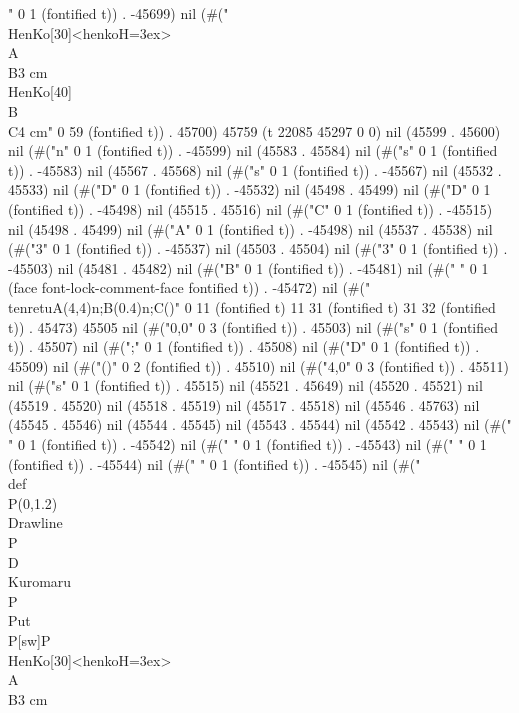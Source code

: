 " 0 1 (fontified t)) . -45699) nil (#("   \\HenKo[30]<henkoH=3ex>\\A\\B{3 cm}
   \\HenKo[40]\\B\\C{4 cm}" 0 59 (fontified t)) . 45700) 45759 (t 22085 45297 0 0) nil (45599 . 45600) nil (#("n" 0 1 (fontified t)) . -45599) nil (45583 . 45584) nil (#("s" 0 1 (fontified t)) . -45583) nil (45567 . 45568) nil (#("s" 0 1 (fontified t)) . -45567) nil (45532 . 45533) nil (#("D" 0 1 (fontified t)) . -45532) nil (45498 . 45499) nil (#("D" 0 1 (fontified t)) . -45498) nil (45515 . 45516) nil (#("C" 0 1 (fontified t)) . -45515) nil (45498 . 45499) nil (#("A" 0 1 (fontified t)) . -45498) nil (45537 . 45538) nil (#("3" 0 1 (fontified t)) . -45537) nil (45503 . 45504) nil (#("3" 0 1 (fontified t)) . -45503) nil (45481 . 45482) nil (#("B" 0 1 (fontified t)) . -45481) nil (#("
" 0 1 (face font-lock-comment-face fontified t)) . -45472) nil (#("   \\tenretu{A(4,4)n;B(0.4)n;C()}" 0 11 (fontified t) 11 31 (fontified t) 31 32 (fontified t)) . 45473) 45505 nil (#("0,0" 0 3 (fontified t)) . 45503) nil (#("s" 0 1 (fontified t)) . 45507) nil (#(";" 0 1 (fontified t)) . 45508) nil (#("D" 0 1 (fontified t)) . 45509) nil (#("()" 0 2 (fontified t)) . 45510) nil (#("4,0" 0 3 (fontified t)) . 45511) nil (#("s" 0 1 (fontified t)) . 45515) nil (45521 . 45649) nil (45520 . 45521) nil (45519 . 45520) nil (45518 . 45519) nil (45517 . 45518) nil (45546 . 45763) nil (45545 . 45546) nil (45544 . 45545) nil (45543 . 45544) nil (45542 . 45543) nil (#("%
" 0 1 (fontified t)) . -45542) nil (#(" " 0 1 (fontified t)) . -45543) nil (#(" " 0 1 (fontified t)) . -45544) nil (#(" " 0 1 (fontified t)) . -45545) nil (#("\\def\\P{(0,1.2)}
   \\Drawline{\\P\\D}
   \\Kuromaru\\P
   \\Put\\P[sw]{P}
   \\HenKo[30]<henkoH=3ex>\\A\\B{3 cm}
